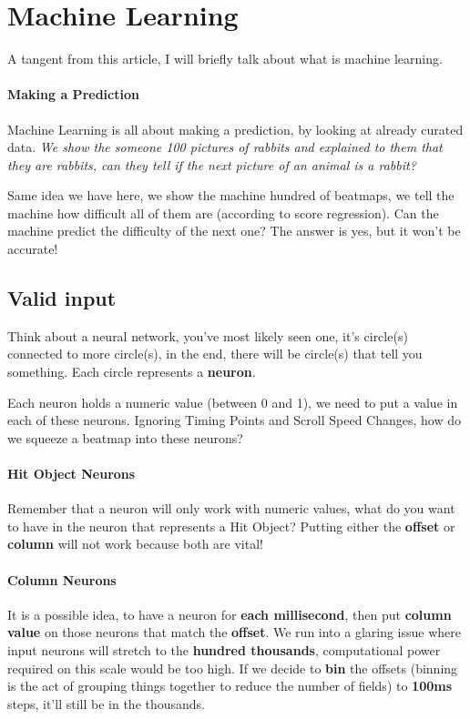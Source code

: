 \documentclass{article}
\begin{document}
\section{Machine Learning}

A tangent from this article, I will briefly talk about what is machine learning.

\paragraph{Making a Prediction} Machine Learning is all about making a prediction, by looking at already curated data. \textit{We show the someone 100 pictures of rabbits and explained to them that they are rabbits, can they tell if the next picture of an animal is a rabbit?}

Same idea we have here, we show the machine hundred of beatmaps, we tell the machine how difficult all of them are (according to score regression). Can the machine predict the difficulty of the next one? The answer is yes, but it won't be accurate!

\subsection{Valid input}

Think about a neural network, you've most likely seen one, it's circle(s) connected to more circle(s), in the end, there will be circle(s) that tell you something. Each circle represents a \textbf{neuron}.

Each neuron holds a numeric value (between 0 and 1), we need to put a value in each of these neurons. Ignoring Timing Points and Scroll Speed Changes, how do we squeeze a beatmap into these neurons?

\paragraph{Hit Object Neurons} Remember that a neuron will only work with numeric values, what do you want to have in the neuron that represents a Hit Object? Putting either the \textbf{offset} or \textbf{column} will not work because both are vital!

\paragraph{Column Neurons} It is a possible idea, to have a neuron for \textbf{each millisecond}, then put \textbf{column value} on those neurons that match the \textbf{offset}. We run into a glaring issue where input neurons will stretch to the \textbf{hundred thousands}, computational power required on this scale would be too high. If we decide to \textbf{bin} the offsets (binning is the act of grouping things together to reduce the number of fields) to \textbf{100ms} steps, it'll still be in the thousands.
\end{document}
